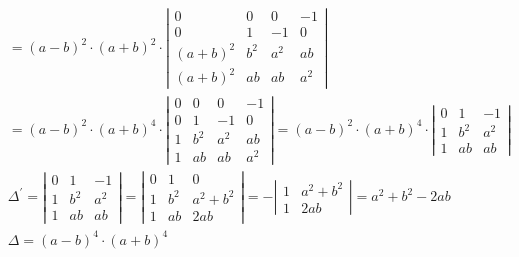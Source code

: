 {{$$\begin{aligned}
	& =(a-b)^2 \cdot(a+b)^2 \cdot\left|\begin{array}{cccc}
		0 & 0 & 0 & -1 \\
		0 & 1 & -1 & 0 \\
		(a+b)^2 & b^2 & a^2 & a b \\
		(a+b)^2 & a b & a b & a^2
	\end{array}\right| \\
	& =(a-b)^2 \cdot(a+b)^4 \cdot\left|\begin{array}{cccc}
		0 & 0 & 0 & -1 \\
		0 & 1 & -1 & 0 \\
		1 & b^2 & a^2 & a b \\
		1 & a b & a b & a^2
	\end{array}\right|=(a-b)^2 \cdot(a+b)^4 \cdot\left|\begin{array}{ccc}
		0 & 1 & -1 \\
		1 & b^2 & a^2 \\
		1 & a b & a b
	\end{array}\right| \\
	& \Delta^{\prime}=\left|\begin{array}{ccc}
		0 & 1 & -1 \\
		1 & b^2 & a^2 \\
		1 & a b & a b
	\end{array}\right|=\left|\begin{array}{ccc}
		0 & 1 & 0 \\
		1 & b^2 & a^2+b^2 \\
		1 & a b & 2 a b
	\end{array}\right|=-\left|\begin{array}{cc}
		1 & a^2+b^2 \\
		1 & 2 a b
	\end{array}\right|=a^2+b^2-2 a b \\
	& \Delta=(a-b)^4 \cdot(a+b)^4 \\
	&
\end{aligned}
$$ }}
